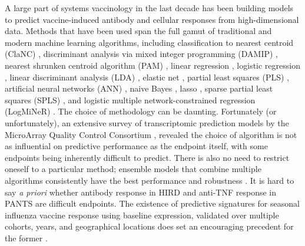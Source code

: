 A large part of systems vaccinology in the last decade has been building models to predict vaccine-induced antibody and cellular responses from high-dimensional data.
Methods that have been used span the full gamut of traditional and modern machine learning algorithms, including
classification to nearest centroid (ClaNC) \autocite{querec2009SystemsBiologyApproach},
discriminant analysis via mixed integer programming (DAMIP) \autocite{querec2009SystemsBiologyApproach,nakaya2011SystemsBiologyVaccination,nakaya2015SystemsAnalysisImmunity,kazmin2017SystemsAnalysisProtective},
nearest shrunken centroid algorithm (PAM) \autocite{vahey2010ExpressionGenesAssociated},
linear regression \autocite{bucasas2011EarlyPatternsGene,li2017MetabolicPhenotypesResponse},
logistic regression \autocite{haynes2012ImmuneCorrelatesAnalysisHIV1,furman2014SystemsAnalysisSex,tan2014GeneSignaturesRelated},
linear discriminant analysis (LDA) \autocite{zak2012MerckAd5HIV,tsang2014GlobalAnalysesHuman},
elastic net \autocite{furman2013ApoptosisOtherImmune},
partial least squares (PLS) \autocite{tsang2014GlobalAnalysesHuman},
artificial neural networks (ANN) \autocite{nakaya2015SystemsAnalysisImmunity},
naive Bayes \autocite{fourati2016PrevaccinationInflammationBcell},
lasso \autocite{qi2016DefectiveMemoryCell},
sparse partial least squares (SPLS) \autocite{rechtien2017SystemsVaccinologyIdentifies},
and logistic multiple network-constrained regression (LogMiNeR)
\autocite{avey2017MultipleNetworkconstrainedRegressions,avey2020SeasonalVariabilityShared}.
The choice of methodology can be daunting.
Fortunately (or unfortunately), 
an extensive survey of transcriptomic prediction models by the MicroArray Quality Control Consortium \autocite{maqcconsortium2010MicroArrayQualityControl},
revealed the choice of algorithm is not as influential on predictive performance as 
the endpoint itself, with some endpoints being inherently difficult to predict.
There is also no need to restrict oneself to a particular method;
ensemble models that combine multiple algorithms consistently have the best performance and robustness \autocite{camacho2018NextGenerationMachineLearning}.
It is hard to say \textit{a priori} whether antibody response in \gls{HIRD} and anti-\gls{TNF} response in \gls{PANTS} are difficult endpoints.
The existence of predictive signatures for seasonal influenza vaccine response using baseline expression, 
validated over multiple cohorts, years, and geographical locations does set an encouraging precedent for the former \autocite{hipc-chisignaturesprojectteam2017MulticohortAnalysisReveals}.
%

